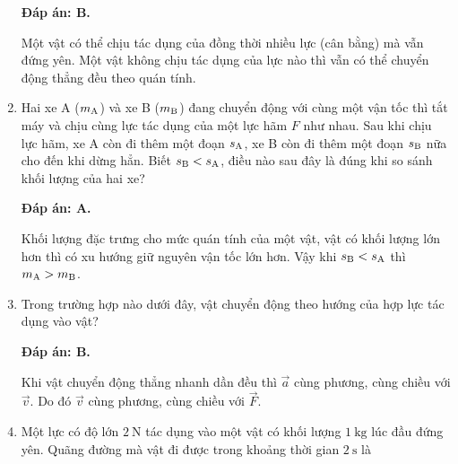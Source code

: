 \begin{enumerate}[label=\bfseries Câu \arabic*:]
	\loigiai
	{\textbf{Đáp án: B.}
		
		Một vật có thể chịu tác dụng của đồng thời nhiều lực (cân bằng) mà vẫn đứng yên. Một vật không chịu tác dụng của lực nào thì vẫn có thể chuyển động thẳng đều theo quán tính.
		
		
	}
	\item {}
	
	\cauhoi
	{Hai xe A ($m_\text A$) và xe B ($m_\text B$) đang chuyển động với cùng một vận tốc thì tắt máy và chịu cùng lực tác dụng của một lực hãm $F$ như nhau. Sau khi chịu lực hãm, xe A còn đi thêm một đoạn $s_\text A$, xe B còn đi thêm một đoạn $s_\text B$ nữa cho đến khi dừng hẳn. Biết $s_\text B < s_\text A$, điều nào sau đây là đúng khi so sánh khối lượng của hai xe?
	}
	
	\loigiai
	{\textbf{Đáp án: A.}
		
		Khối lượng đặc trưng cho mức quán tính của một vật, vật có khối lượng lớn hơn thì có xu hướng giữ nguyên vận tốc lớn hơn. Vậy khi $s_\text B < s_\text A$ thì $m_\text A > m_\text B$.
		
		
	}
	\item {}
	
	\cauhoi
	{Trong trường hợp nào dưới đây, vật chuyển động theo hướng của hợp lực tác dụng vào vật?
	}
	
	\loigiai
	{\textbf{Đáp án: B.}
		
		Khi vật chuyển động thẳng nhanh dần đều thì $\vec a$ cùng phương, cùng chiều với $\vec v$. Do đó $\vec v$ cùng phương, cùng chiều với $\vec F$.
		
		
	}
	\item {}
	
	\cauhoi
	{Một lực có độ lớn $\SI{2}{\newton}$ tác dụng vào một vật có khối lượng $\SI{1}{\kilogram}$ lúc đầu đứng yên. Quãng đường mà vật đi được trong khoảng thời gian $\SI{2}{\second}$ là
	}
	

\end{enumerate}
